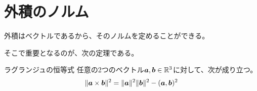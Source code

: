 \documentclass[../../../topic_linear-algebra]{subfiles}
\begin{document}
\sectionline
\section{外積のノルム}

外積はベクトルであるから、そのノルムを定めることができる。

\br

そこで重要となるのが、次の定理である。

\begin{theorem*}{ラグランジュの恒等式}
  任意の2つのベクトル$\vb*{a}, \vb*{b} \in \mathbb{R}^3$に対して、次が成り立つ。
  \begin{equation*}
    \| \vb*{a} \times \vb*{b} \|^2 = \| \vb*{a} \|^2 \| \vb*{b} \|^2 - ( \vb*{a} ,\vb*{b} )^2
  \end{equation*}
\end{theorem*}
\end{document}
